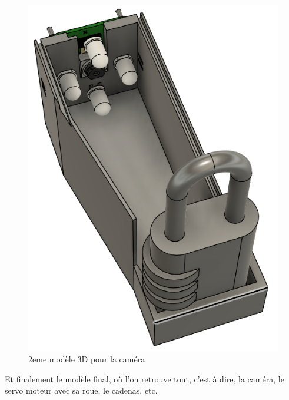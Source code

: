 \documentclass[twoside]{article}
\begin{document}
\begin{multicols}{2}
\begin{figure}[H]
\centering
\includegraphics[scale=0.4]{cameralocker2dstruct.png}
\caption{2eme modèle 3D pour la caméra}
\end{figure}

Et finalement le modèle final, où l'on retrouve tout, c'est à dire, la caméra, le servo moteur avec sa roue, le cadenas, etc.


\end{multicols}
\end{document}
